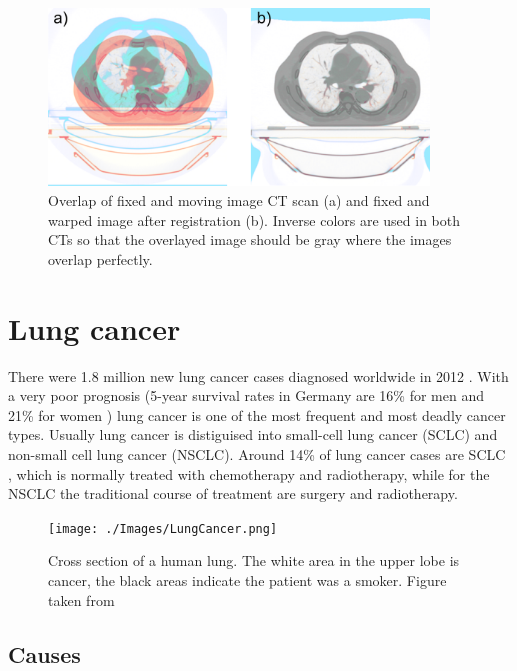\documentclass[type=dr, dr=rernat, accentcolor=tud7b,colorbacktitle, bigchapter, openright, twoside, 12pt ]{tudthesis}
\begin{document}
\begin{figure}[H]
\begin{center}
\includegraphics[width=0.9\textwidth]{./Images/RegistrationCompare.png}
\caption{Overlap of fixed and moving image CT scan (a) and fixed and warped image after registration (b). Inverse colors are used in both CTs so that the overlayed image should be gray
where the images overlap perfectly.}
\label{RegistrationCompare}
\end{center}
\end{figure}

\section{Lung cancer}

There were 1.8 million new lung cancer cases diagnosed worldwide in 2012 \cite{Worldwide2012}. With a very poor prognosis (5-year survival rates in Germany are
16\% for men and 21\% for women \cite{Kaatsch2014}) lung cancer is one of the most frequent and most deadly cancer types. Usually lung cancer is distiguised
into small-cell lung cancer (SCLC) and non-small cell lung cancer (NSCLC). Around 14\% of lung cancer cases are SCLC \cite{Tsao2008}, which is normally treated with chemotherapy and radiotherapy, while for the NSCLC the traditional course of treatment
are surgery and radiotherapy.

\begin{figure}[H]
	\begin{center}
		\texttt{[image: ./Images/LungCancer.png]}
		\caption{Cross section of a human lung. The white area in the upper lobe is cancer, the black areas indicate the patient was a smoker. Figure taken from \cite{LungCancer}}
		\label{Fig:Stages}
	\end{center}
\end{figure}


\subsection{Causes}
\end{document}
